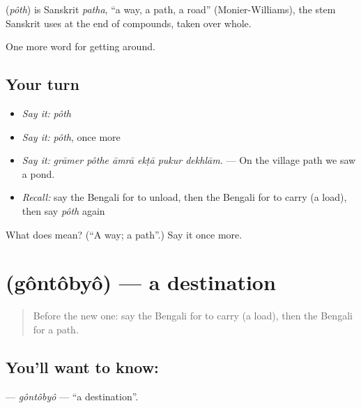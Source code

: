 \begin{cousinweb}
\textbf{} (\emph{pôth}) is Sanskrit \emph{patha}, \textquotedblleft{}a way, a path, a road\textquotedblright{} (Monier-Williams), the stem Sanskrit uses at the end of compounds, taken over whole.
\end{cousinweb}

\begin{grammarlens}[title={What you've built}]
One more word for getting around.
\end{grammarlens}

\subsection*{Your turn}
\begin{itemize}
\raggedright
  \item \emph{Say it:} \emph{pôth}
  \item \emph{Say it:} \emph{pôth}, once more
  \item \emph{Say it:} \emph{grāmer pôthe āmrā ekṭā pukur dekhlām.} — On the village path we saw a pond.
  \item \emph{Recall:} say the Bengali for to unload, then the Bengali for to carry (a load), then say \emph{pôth} again
\end{itemize}

\begin{tcolorbox}[breakable,colback=teal!4,colframe=teal!35!black,title={Before you move on}]
What does  mean? (\textquotedblleft{}A way; a path\textquotedblright{}.) Say it once more.
\end{tcolorbox}
\section[\texorpdfstring{\bn{গন্তব্য} (gôntôbyô)}{গন্তব্য (gôntôbyô)}]{ (gôntôbyô) — a destination}

\label{lesson:BN-C387-gontobyo}



\begin{quote}
Before the new one: say the Bengali for to carry (a load), then the Bengali for a path.
\end{quote}

\subsection*{You'll want to know: }
\textbf{} — \emph{gôntôbyô} — \textquotedblleft{}a destination\textquotedblright{}.

